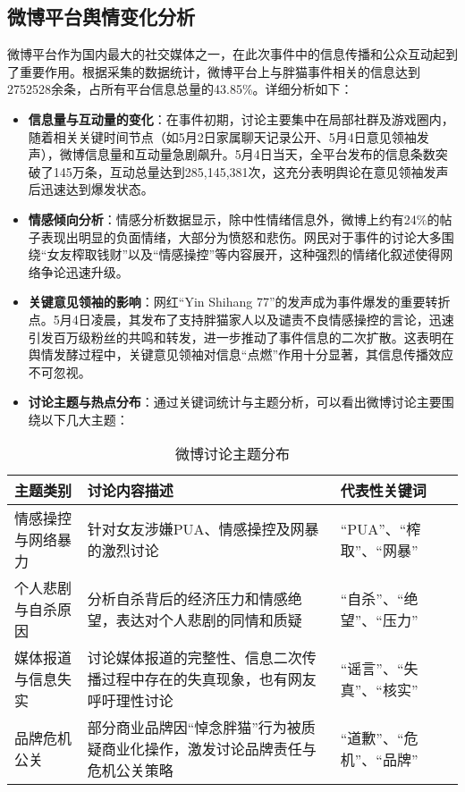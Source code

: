 \documentclass{article}
\begin{document}
\subsection{微博平台舆情变化分析}
微博平台作为国内最大的社交媒体之一，在此次事件中的信息传播和公众互动起到了重要作用。根据采集的数据统计，微博平台上与胖猫事件相关的信息达到2752528余条，占所有平台信息总量的43.85\%。详细分析如下：
\begin{itemize}
    \item \textbf{信息量与互动量的变化}：在事件初期，讨论主要集中在局部社群及游戏圈内，随着相关关键时间节点（如5月2日家属聊天记录公开、5月4日意见领袖发声），微博信息量和互动量急剧飙升。5月4日当天，全平台发布的信息条数突破了145万条，互动总量达到285,145,381次，这充分表明舆论在意见领袖发声后迅速达到爆发状态。
    \item \textbf{情感倾向分析}：情感分析数据显示，除中性情绪信息外，微博上约有24\%的帖子表现出明显的负面情绪，大部分为愤怒和悲伤。网民对于事件的讨论大多围绕“女友榨取钱财”以及“情感操控”等内容展开，这种强烈的情绪化叙述使得网络争论迅速升级。
    \item \textbf{关键意见领袖的影响}：网红“Yin Shihang 77”的发声成为事件爆发的重要转折点。5月4日凌晨，其发布了支持胖猫家人以及谴责不良情感操控的言论，迅速引发百万级粉丝的共鸣和转发，进一步推动了事件信息的二次扩散。这表明在舆情发酵过程中，关键意见领袖对信息“点燃”作用十分显著，其信息传播效应不可忽视。
    \item \textbf{讨论主题与热点分布}：通过关键词统计与主题分析，可以看出微博讨论主要围绕以下几大主题：
\end{itemize}
\begin{table}[htbp]
\centering
\caption{微博讨论主题分布}
\begin{tabular}{p{3cm}p{6cm}p{4cm}}
\toprule
主题类别 & 讨论内容描述 & 代表性关键词 \\
\midrule
情感操控与网络暴力 & 针对女友涉嫌PUA、情感操控及网暴的激烈讨论 & “PUA”、“榨取”、“网暴” \\
个人悲剧与自杀原因 & 分析自杀背后的经济压力和情感绝望，表达对个人悲剧的同情和质疑 & “自杀”、“绝望”、“压力” \\
媒体报道与信息失实 & 讨论媒体报道的完整性、信息二次传播过程中存在的失真现象，也有网友呼吁理性讨论 & “谣言”、“失真”、“核实” \\
品牌危机公关 & 部分商业品牌因“悼念胖猫”行为被质疑商业化操作，激发讨论品牌责任与危机公关策略 & “道歉”、“危机”、“品牌” \\
\bottomrule
\end{tabular}
\end{table}
\end{document}
